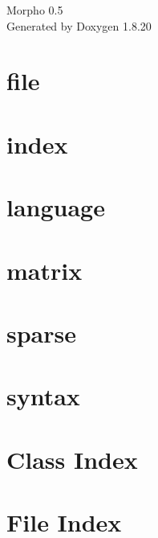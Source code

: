 \let\mypdfximage\pdfximage\def\pdfximage{\immediate\mypdfximage}\documentclass[twoside]{book}
\newcommand{\+}{\discretionary{\mbox{\scriptsize$\hookleftarrow$}}{}{}}
\newcommand{\clearemptydoublepage}{%
  \newpage{\pagestyle{empty}\cleardoublepage}%
}
\begin{document}
\hypersetup{pageanchor=false,
             bookmarksnumbered=true,
             pdfencoding=unicode
            }
\begin{titlepage}
\vspace*{7cm}
\begin{center}%
{\Large Morpho 0.5 }\\
\vspace*{1cm}
{\large Generated by Doxygen 1.8.20}\\
\end{center}
\end{titlepage}
\clearemptydoublepage
{}
\tableofcontents
\clearemptydoublepage
{}
\hypersetup{pageanchor=true}

\chapter{file}
\label{md_help_file}

\chapter{index}
\label{md_help_index}

\chapter{language}
\label{md_help_language}

\chapter{matrix}
\label{md_help_matrix}

\chapter{sparse}
\label{md_help_sparse}

\chapter{syntax}
\label{md_help_syntax}

\chapter{Class Index}

\chapter{File Index}

\end{document}
